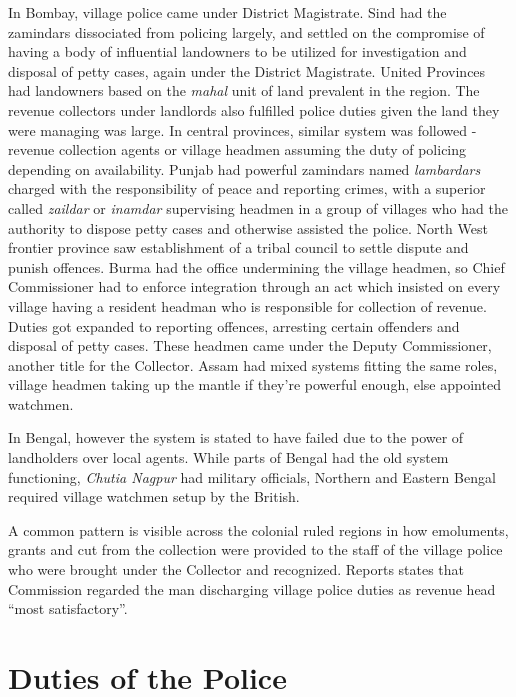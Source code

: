 \documentclass[a4paper]{article}
\begin{document}
In Bombay, village police came under District Magistrate.  Sind
had the zamindars dissociated from policing largely, and
settled on the compromise of having a body of influential
landowners to be utilized for investigation and disposal of
petty cases, again under the District Magistrate. United
Provinces had landowners based on the \emph{mahal} unit of land
prevalent in the region. The revenue collectors under landlords
also fulfilled police duties given the land they were managing
was large. In central provinces, similar system was followed -
revenue collection agents or village headmen assuming the duty
of policing depending on availability. Punjab had powerful
zamindars named \emph{lambardars} charged with the
responsibility of peace and reporting crimes, with a superior
called \emph{zaildar} or \emph{inamdar} supervising headmen in
a group of villages who had the authority to dispose petty cases
and otherwise assisted the police. North West frontier province
saw establishment of a tribal council to settle dispute and
punish offences. Burma had the office undermining the village
headmen, so Chief Commissioner had to enforce integration
through an act which insisted on every village having a resident
headman who is responsible for collection of revenue. Duties got
expanded to reporting offences, arresting certain offenders and
disposal of petty cases. These headmen came under the Deputy
Commissioner, another title for the Collector. Assam had mixed
systems fitting the same roles, village headmen taking up the
mantle if they're powerful enough, else appointed watchmen.

In Bengal, however the system is stated to have failed due to
the power of landholders over local agents. While parts of
Bengal had the old system functioning, \emph{Chutia Nagpur} had
military officials, Northern and Eastern Bengal required
village watchmen setup by the British.

A common pattern is visible across the colonial ruled regions
in how emoluments, grants and cut from the collection were provided to
the staff of the village police who were brought under the
Collector and recognized. Reports states that Commission
regarded the man discharging village police duties as revenue
head ``most satisfactory''\cite[p. 38]{india1913history}.

\section*{Duties of the Police}
\end{document}

